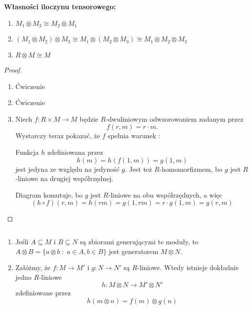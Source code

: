 \textbf{\large\color{green}Własności iloczynu tensorowego:}

\begin{enumerate}
  \item $M_1\otimes M_2\cong M_2\otimes M_1$
  \item $(M_1\otimes M_2)\otimes M_3\cong M_1\otimes (M_2\otimes M_3)\cong M_1\otimes M_2\otimes M_3$
  \item $R\otimes M\cong M$
\end{enumerate}

\begin{proof}$ $\newline
  \begin{enumerate}
    \item Ćwiczenie
    \item Ćwiczenie
    \item Niech $f:R\times M\to M$ będzie $R$-dwuliniowym odwzorowaniem zadanym przez
      $$f(r,m)=r\cdot m.$$
      Wystarczy teraz pokazać, że $f$ spełnia warunek \hyperref[warunek:z:12.3]{{\color{purple}\PHcat}}:

      \begin{center}\end{center}

      Funkcja $h$ zdefiniowana przez
      $$h(m)=h(f(1,m))=g(1,m)$$
      jest jedyna ze względu na jedyność $g$. Jest też $R$-homomorfizmem, bo $g$ jest $R$-liniowe na drugiej współrzędnej.

      Diagram komutuje, bo $g$ jest $R$-liniowe na obu współrzędnych, a więc
      $$(h\circ f)(r, m)=h(rm)=g(1, rm)=r\cdot g(1, m)=g(r, m)$$
  \end{enumerate}
\end{proof}

\begin{remark}\label{uwaga:13.1}$ $\newline
  \begin{enumerate}
    \item Jeśli $A\subseteq M$ i $B\subseteq N$ są zbiorami generującymi te moduły, to $A\otimes B=\{a\otimes b\;:\;a\in A,b\in B\}$ jest generatorem $M\otimes N$.
    \item Załóżmy, że $f:M\to M'$ i $g:N\to N'$ są $R$-liniowe. Wtedy istnieje dokładnie jedno $R$-liniowe
      $$h:M\otimes N\to M'\otimes N'$$
      zdefiniowane przez
      $$h(m\otimes n)=f(m)\otimes g(n)$$
  \end{enumerate}
\end{remark}

